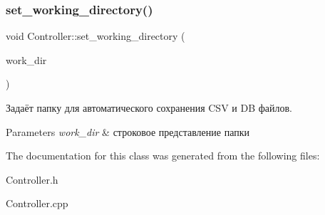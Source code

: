 \subsubsection{\texorpdfstring{set\+\_\+working\+\_\+directory()}{set\_working\_directory()}}
{\footnotesize\ttfamily void Controller\+::set\+\_\+working\+\_\+directory (\begin{DoxyParamCaption}\item[{const Q\+String \&}]{work\+\_\+dir }\end{DoxyParamCaption})}



Задаёт папку для автоматического сохранения C\+SV и DB файлов. 


\begin{DoxyParams}{Parameters}
{\em work\+\_\+dir} & строковое представление папки \\
\hline
\end{DoxyParams}


The documentation for this class was generated from the following files\+:\begin{DoxyCompactItemize}
\item 
Controller.\+h\item 
Controller.\+cpp\end{DoxyCompactItemize}
